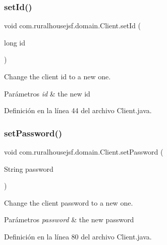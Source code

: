 \subsubsection{\texorpdfstring{setId()}{setId()}}
{\footnotesize\ttfamily void com.\+ruralhousejsf.\+domain.\+Client.\+set\+Id (\begin{DoxyParamCaption}\item[{long}]{id }\end{DoxyParamCaption})}



Change the client id to a new one. 


\begin{DoxyParams}{Parámetros}
{\em id} & the new id \\
\hline
\end{DoxyParams}


Definición en la línea 44 del archivo Client.\+java.

\mbox{\label{classcom_1_1ruralhousejsf_1_1domain_1_1_client_a89d703e0377510769b326334f31fbb8d}} 
\subsubsection{\texorpdfstring{setPassword()}{setPassword()}}
{\footnotesize\ttfamily void com.\+ruralhousejsf.\+domain.\+Client.\+set\+Password (\begin{DoxyParamCaption}\item[{String}]{password }\end{DoxyParamCaption})}



Change the client password to a new one. 


\begin{DoxyParams}{Parámetros}
{\em password} & the new password \\
\hline
\end{DoxyParams}


Definición en la línea 80 del archivo Client.\+java.

\mbox{\label{classcom_1_1ruralhousejsf_1_1domain_1_1_client_acf233b95ed06204b7724cc7d277352ab}} 
